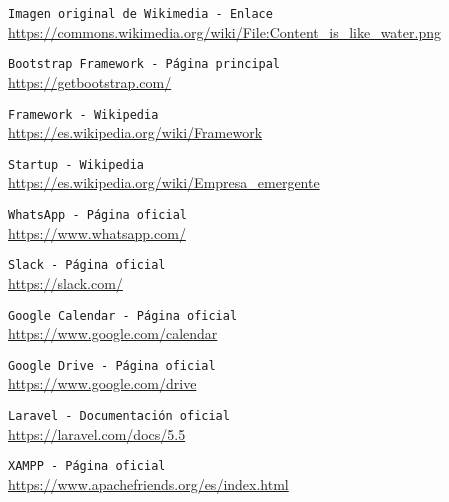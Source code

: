  {\tt Imagen original de Wikimedia - Enlace}\\
\url{https://commons.wikimedia.org/wiki/File:Content_is_like_water.png}

 {\tt Bootstrap Framework - Página principal}\\
\url{https://getbootstrap.com/}

 {\tt Framework - Wikipedia}\\
\url{https://es.wikipedia.org/wiki/Framework}

 {\tt Startup - Wikipedia}\\
\url{https://es.wikipedia.org/wiki/Empresa_emergente}

 {\tt WhatsApp - Página oficial}\\
\url{https://www.whatsapp.com/}

 {\tt Slack - Página oficial}\\
\url{https://slack.com/}

 {\tt Google Calendar - Página oficial}\\
\url{https://www.google.com/calendar}

 {\tt Google Drive - Página oficial}\\
\url{https://www.google.com/drive}

 {\tt Laravel - Documentación oficial}\\
\url{https://laravel.com/docs/5.5}

 {\tt XAMPP - Página oficial}\\
\url{https://www.apachefriends.org/es/index.html}





















